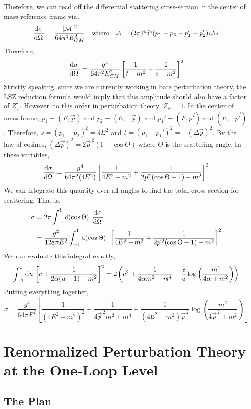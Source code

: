 \documentclass[12pt]{extarticle}
\begin{document}
Therefore, we can read off the differential scattering cross-section in the center of mass reference frame via,
\[ \frac{\mathrm{d}\sigma \:}{\mathrm{d}\Omega \:} = \frac{|\mathcal{M}|^2}{64 \pi^2 E_{CM}^2}
 \quad \text{where} \quad \mathcal{A} = (2 \pi)^4 \delta^4(p_1 + p_2 - p_1' - p_2') i \mathcal{M}\]
Therefore,
\[ \frac{\mathrm{d}\sigma \:}{\mathrm{d}\Omega \:} = \frac{g^4}{64 \pi^2 E_{CM}^2} \left[ \frac{1}{t - m^2} + \frac{1}{s - m^2} \right]^2 \]
Strictly speaking, since we are currently working in bare perturbation theory, the LSZ reduction formula would imply that this amplitude should also have a factor of $Z_\psi^2$. However, to this order in perturbation theory, $Z_\psi = 1$.
In the center of mass frame, $p_1 = (E, \vec{p})$ and $p_2 = (E, -\vec{p})$ and $p_1' = (E, \vec{p'})$ and $(E, -\vec{p'})$. Therefore, $s = (p_1 + p_2)^2 = 4 E^2$ and $t = (p_1 - p_1')^2 = - (\Delta \vec{p})^2$. By the law of cosines, $(\Delta \vec{p})^2 = 2 \vec{p}^{\, 2} (1 - \cos{\Theta})$ where $\Theta$ is the scattering angle. In these variables,
\[ \frac{\mathrm{d}\sigma \:}{\mathrm{d}\Omega \:} = \frac{g^4}{64 \pi^2 (4 E^2)} \left[ \frac{1}{4 E^2 - m^2} + \frac{1}{2 \vec{p}^{\, 2} ( \cos{\Theta} - 1)  - m^2} \right]^2 \]
We can integrate this quantity over all angles to find the total cross-section for scattering. That is,
\begin{align*}
\sigma &= 2 \pi \int_{-1}^1 \mathrm{d}(\cos{\Theta}) \: \: \frac{\mathrm{d}\sigma \:}{\mathrm{d}\Omega \:} \\
& = \frac{g^2}{128 \pi E^2} \int_{-1}^1 \mathrm{d}(\cos{\Theta}) \: \: \left[ \frac{1}{4 E^2 - m^2} + \frac{1}{2 \vec{p}^{\, 2} ( \cos{\Theta} - 1)  - m^2} \right]^2
\end{align*}
We can evaluate this integral exactly,
\[ \int_{-1}^1 \mathrm{d}u \: \left[c + \frac{1}{2 \alpha (u -1) - m^2} \right]^2 = 2 \left(c^2 + \frac{1}{4 \alpha m^2 + m^4} + \frac{c}{a} \log{\left(\frac{m^2}{4 \alpha + m^2}\right)} \right)\]
Putting everything together,
\[ \sigma = \frac{g^4}{64 \pi E^2} \left[ \frac{1}{(4 E^2 - m^2)^2} + \frac{1}{4 \vec{p}^{\, 2} m^2 + m^4} + \frac{1}{(4 E^2 - m^2) \vec{p}^{\, 2}} \log{\left(\frac{m^2}{4 \vec{p}^{\, 2} + m^2}\right)}   \right] \]

\section*{Renormalized Perturbation Theory at the One-Loop Level}

\subsection*{The Plan}
\end{document}
